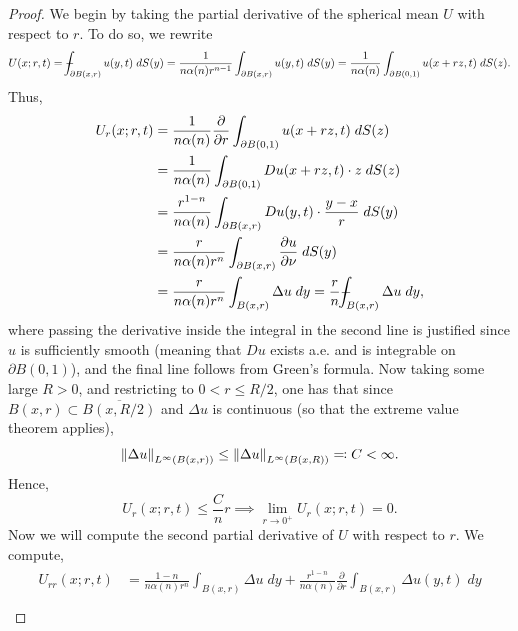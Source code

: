 \documentclass{article}
\def\Xint#1{\mathchoice
	{\XXint\displaystyle\textstyle{#1}}%
	{\XXint\textstyle\scriptstyle{#1}}%
	{\XXint\scriptstyle\scriptscriptstyle{#1}}%
	{\XXint\scriptscriptstyle\scriptscriptstyle{#1}}%
	\!\int}
\def\XXint#1#2#3{{\setbox0=\hbox{$#1{#2#3}{\int}$ }
		\vcenter{\hbox{$#2#3$ }}\kern-0.6\wd0}}
\def\dashint{\Xint-}
\numberwithin{equation}{section}
\begin{document}
	\begin{proof}
		We begin by taking the partial derivative of the spherical mean $U$ with respect to $r$. To do so, we rewrite 
		\begin{equation*}
			U(x;r,t) = \dashint_{\partial B(x, r)}u(y,t)\;dS(y) = \frac{1}{n\alpha(n)r^{n-1}}\int_{\partial B(x, r)}u(y,t)\;dS(y) = \frac{1}{n\alpha(n)}\int_{\partial B(0,1)}u(x + rz, t)\;dS(z). 
		\end{equation*}
		Thus, 
		\begin{align*}
			\begin{split}
				U_{r}(x;r, t) &= \frac{1}{n\alpha(n)}\frac{\partial}{\partial r}\int_{\partial B(0,1)}u(x + rz, t)\;dS(z) \\
				&= \frac{1}{n\alpha(n)}\int_{\partial B(0,1)}Du(x + rz, t) \cdot z \;dS(z) \\
				&= \frac{r^{1-n}}{n\alpha(n)}\int_{\partial B(x, r)}Du(y, t) \cdot \frac{y -x}{r}\;dS(y) \\
				&= \frac{r}{n\alpha(n)r^{n}}\int_{\partial B(x, r)}\frac{\partial u}{\partial \nu}\;dS(y) \\
				&= \frac{r}{n\alpha(n)r^{n}}\int_{B(x, r)}\Delta u\;dy = \frac{r}{n}\dashint_{B(x, r)}\Delta u\;dy,
			\end{split}
		\end{align*}
		where passing the derivative inside the integral in the second line is justified since $u$ is sufficiently smooth (meaning that $Du$ exists a.e. and is integrable on $\partial B(0,1)$), and the final line follows from Green's formula. Now taking some large $R > 0$, and restricting to $0 < r \leq R/2$, one has that since $B(x,r) \subset \overline{B(x, R/2)}$ and $\Delta u$ is continuous (so that the extreme value theorem applies), 
		\begin{equation*}
			\left\Vert \Delta u \right\Vert_{L^{\infty}(B(x, r))} \leq \left\Vert \Delta u \right\Vert_{L^{\infty}(B(x, R))} \eqqcolon C < \infty. 
		\end{equation*}
		Hence, 
		\begin{equation*}
			U_{r}(x;r, t) \leq \frac{C}{n}r \implies \lim_{r \to 0^{+}}U_{r}(x;r, t) = 0.
		\end{equation*}
		Now we will compute the second partial derivative of $U$ with respect to $r$. We compute, 
		\begin{align*}
			\begin{split}
				U_{rr}(x;r, t) &= \frac{1 -n}{n\alpha(n)r^{n}}\int_{B(x, r)}\Delta u\;dy + \frac{r^{1-n}}{n\alpha(n)}\frac{\partial}{\partial r}\int_{B(x, r)}\Delta u(y,t)\;dy \\

\end{split}
\end{align*}
\end{proof}
\end{document}
